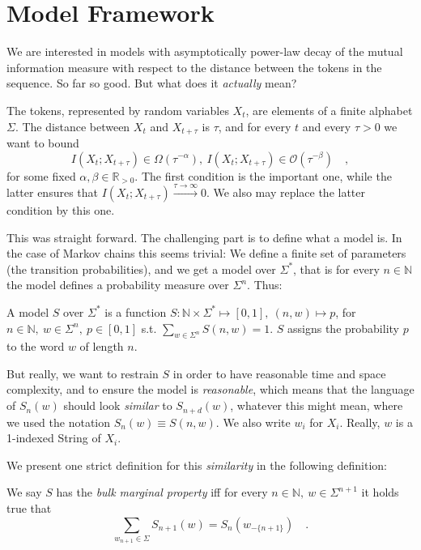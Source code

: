 \documentclass[../../main.tex]{subfiles}
\begin{document}
\section{Model Framework}
    We are interested in models with asymptotically power-law decay of the mutual information measure with respect to the distance between the tokens in the sequence. So far so good. But what does it \emph{actually} mean?

    The tokens, represented by random variables $X_t$, are elements of a finite alphabet $\Sigma$. The distance between $X_t$ and $X_{t + \tau}$ is $\tau$, and for every $t$ and every $\tau > 0$ we want to bound
    \[
        I(X_t; X_{t + \tau}) \in \Omega(\tau^{-\alpha}), \ I(X_t; X_{t + \tau}) \in \mathcal{O}(\tau^{-\beta}) \quad ,
    \]
    for some fixed $\alpha, \beta \in \mathbb{R}_{>0}$. The first condition is the important one, while the latter ensures that $I(X_t; X_{t + \tau}) \xrightarrow{\tau \to \infty} 0$. We also may replace the latter condition by this one.

    This was straight forward. The challenging part is to define what a  model is. In the case of Markov chains this seems trivial: We define a finite set of parameters (the transition probabilities), and we get a model over $\Sigma^*$, that is for every $n \in \mathbb{N}$ the model defines a probability measure over $\Sigma^n$. Thus:

    \begin{definition}
        A model $S$ over $\Sigma^*$ is a function $S: \mathbb{N} \times \Sigma^* \mapsto [0, 1], \ (n, w) \mapsto p$, for $n \in \mathbb{N}, \ w \in \Sigma^n, \ p \in [0, 1]$ s.t. $\sum_{w \in \Sigma^n} S(n, w) = 1$. $S$ assigns the probability $p$ to the word $w$ of length $n$.
    \end{definition}

    But really, we want to restrain $S$ in order to have reasonable time and space complexity, and to ensure the model is \emph{reasonable}, which means that the language of $S_n(w)$ should look \emph{similar} to $S_{n + d}(w)$, whatever this might mean, where we used the notation $S_n(w) \equiv S(n, w)$. We also write $w_i$ for $X_i$. Really, $w$ is a 1-indexed String of $X_i$.  

    We present one strict definition for this \emph{similarity} in the following definition:

    \begin{definition}
        We say $S$ has the \emph{bulk marginal property} iff for every $n \in \mathbb{N}, \ w \in \Sigma^{n + 1}$ it holds true that
        \[
            \sum_{w_{n + 1} \in \Sigma} S_{n + 1}(w) = S_n(w_{-\{n + 1\}}) \quad .
        \]
    \end{definition}
\end{document}
